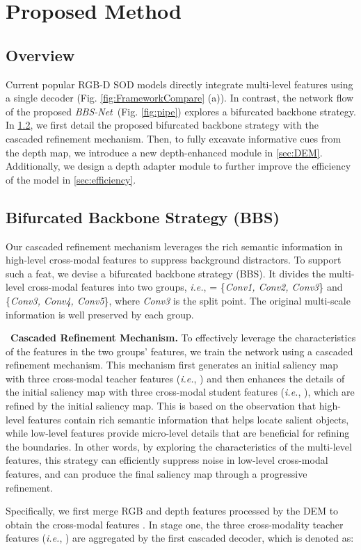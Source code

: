 \documentclass[journal]{IEEEtran}
\newcommand{\figref}[1]{Fig. \ref{#1}}
\newcommand{\secref}[1]{\ref{#1}}
\newcommand{\myPara}[1]{\vspace{10pt}\noindent~\textbf{#1} \quad}
\def\ie{\emph{i.e.}}
\def\ourmodel{\emph{BBS-Net}}
\begin{document}
\section{Proposed Method}\label{sec:proposedMethod}
\subsection{Overview}\label{sec:overview}
Current popular RGB-D SOD models directly integrate multi-level features using a single decoder (\figref{fig:FrameworkCompare} (a)).
In contrast, the network flow of the proposed \ourmodel~(\figref{fig:pipe}) explores a bifurcated backbone strategy.
In \secref{sec:BifucatedStrategy}, we first detail the proposed bifurcated backbone strategy with the cascaded refinement mechanism. Then, to fully excavate informative cues from the depth map, we introduce a new depth-enhanced module in \secref{sec:DEM}.
Additionally, we design a depth adapter module to further improve the efficiency of the model in \secref{sec:efficiency}.

\subsection{Bifurcated Backbone Strategy (BBS)}\label{sec:BifucatedStrategy}


Our cascaded refinement mechanism leverages the rich semantic information in high-level cross-modal features to suppress background distractors.
To support such a feat, we devise a bifurcated backbone strategy (BBS). It divides the multi-level cross-modal features into two groups, \ie,  = \{\textit{Conv1, Conv2, Conv3}\} and \{\textit{Conv3, Conv4, Conv5}\}, where \textit{Conv3} is the split point.
The original multi-scale information is well preserved by each group.

\myPara{\textbf{Cascaded Refinement Mechanism.}}
To effectively leverage the characteristics of the features in the two groups' features, we train the network using a cascaded refinement mechanism.
This mechanism first generates an initial saliency map with three cross-modal teacher features (\ie, ) and then enhances the details of the initial saliency map  with three cross-modal student features (\ie, ), which are refined by the
initial saliency map. 
This is based on the observation that high-level features contain rich semantic information that helps locate salient objects, while low-level features provide micro-level details that are beneficial for refining the boundaries.
In other words, by exploring the characteristics of the multi-level features, this strategy can efficiently suppress noise in low-level cross-modal features, and can produce the final saliency map through a progressive refinement. \par
Specifically, we first merge RGB and depth features processed by the DEM to obtain the cross-modal features .
In stage one, the three cross-modality teacher features (\ie, ) are aggregated by the first cascaded decoder, which is denoted as:
\end{document}
